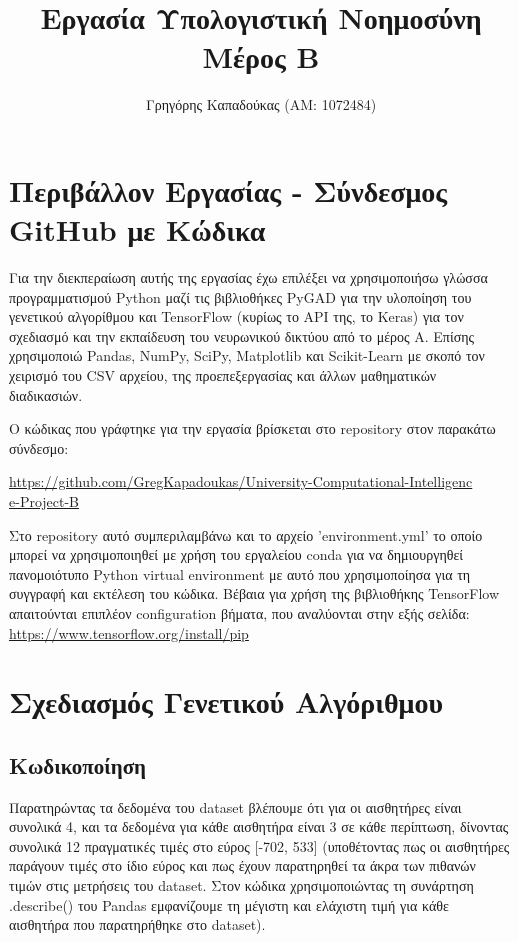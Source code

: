 \documentclass[12pt,a4paper]{article}
\title{Εργασία Υπολογιστική Νοημοσύνη\\Μέρος Β}
\author{Γρηγόρης Καπαδούκας (ΑΜ: 1072484)}
\begin{document}
\maketitle

\setcounter{section}{-1}
\section{Περιβάλλον Εργασίας - Σύνδεσμος GitHub με Κώδικα}
Για την διεκπεραίωση αυτής της εργασίας έχω επιλέξει να χρησιμοποιήσω γλώσσα προγραμματισμού Python μαζί τις βιβλιοθήκες PyGAD για την υλοποίηση του γενετικού αλγορίθμου και TensorFlow (κυρίως το API της, το Keras) για τον σχεδιασμό και την εκπαίδευση του νευρωνικού δικτύου από το μέρος Α. Επίσης χρησιμοποιώ Pandas, NumPy, SciPy, Matplotlib και Scikit-Learn με σκοπό τον χειρισμό του CSV αρχείου, της προεπεξεργασίας και άλλων μαθηματικών διαδικασιών.

Ο κώδικας που γράφτηκε για την εργασία βρίσκεται στο repository στον παρακάτω σύνδεσμο:

\textcolor{blue}{\href{https://github.com/GregKapadoukas/University-Computational-Intelligence-Project-B}{https://github.com/GregKapadoukas/University-Computational-Intelligenc\\e-Project-B}}

Στο repository αυτό συμπεριλαμβάνω και το αρχείο 'environment.yml' το οποίο μπορεί να χρησιμοποιηθεί με χρήση του εργαλείου conda για να δημιουργηθεί πανομοιότυπο Python virtual environment με αυτό που χρησιμοποίησα για τη συγγραφή και εκτέλεση του κώδικα. Βέβαια για χρήση της βιβλιοθήκης TensorFlow απαιτούνται επιπλέον configuration βήματα, που αναλύονται στην εξής σελίδα:
\textcolor{blue}{\href{https://www.tensorflow.org/install/pip}{https://www.tensorflow.org/install/pip}}

\section{Σχεδιασμός Γενετικού Αλγόριθμου}

\subsection{Κωδικοποίηση}

Παρατηρώντας τα δεδομένα του dataset βλέπουμε ότι για οι αισθητήρες είναι συνολικά 4, και τα δεδομένα για κάθε αισθητήρα είναι 3 σε κάθε περίπτωση, δίνοντας συνολικά 12 πραγματικές τιμές στο εύρος [-702, 533] (υποθέτοντας πως οι αισθητήρες παράγουν τιμές στο ίδιο εύρος και πως έχουν παρατηρηθεί τα άκρα των πιθανών τιμών στις μετρήσεις του dataset. Στον κώδικα χρησιμοποιώντας τη συνάρτηση .describe() του Pandas εμφανίζουμε τη μέγιστη και ελάχιστη τιμή για κάθε αισθητήρα που παρατηρήθηκε στο dataset).
\end{document}
